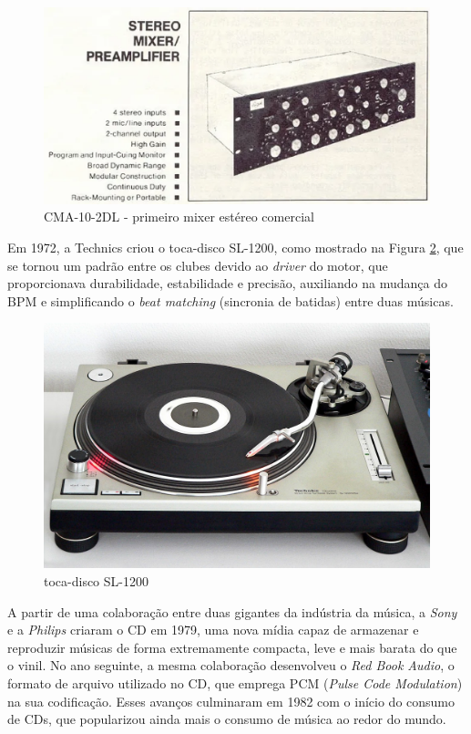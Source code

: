 \begin{figure}[h]
	\centering
    \includegraphics[scale=0.6]{figuras/fig10.eps}
	\caption{CMA-10-2DL - primeiro mixer estéreo comercial \cite{electronicaptBozak102}}
	\label{fig10}
\end{figure}

Em 1972, a Technics criou o toca-disco SL-1200, como mostrado na Figura \ref{fig14}, que se tornou um padrão entre os clubes devido ao \textit{driver} do motor, que proporcionava durabilidade, estabilidade e precisão, auxiliando na mudança do BPM e simplificando o \textit{beat matching} (sincronia de batidas) entre duas músicas.

\begin{figure}[h]
	\centering
    \includegraphics[scale=0.25]{figuras/fig14.png}
	\caption{toca-disco SL-1200 \cite{wikimediaFileTechnicsSL1200MK22jpg}}
	\label{fig14}
\end{figure}

A partir de uma colaboração entre duas gigantes da indústria da música, a \textit{Sony} e a \textit{Philips} criaram o CD em 1979, uma nova mídia capaz de armazenar e reproduzir músicas de forma extremamente compacta, leve e mais barata do que o vinil. No ano seguinte, a mesma colaboração desenvolveu o \textit{Red Book Audio}, o formato de arquivo utilizado no CD, que emprega PCM (\textit{Pulse Code Modulation}) na sua codificação. Esses avanços culminaram em 1982 com o início do consumo de CDs, que popularizou ainda mais o consumo de música ao redor do mundo.

